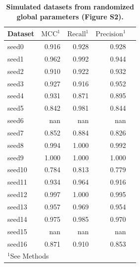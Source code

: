 \begin{table}
\caption{\label{tab:example} \textbf{Simulated datasets from randomized global parameters (Figure S2).}}
\begin{tabular}{lrrrr}
\toprule
Dataset &  $\textrm{MCC}^1$ &  $\textrm{Recall}^1$ &  $\textrm{Precision}^1$ \\
\midrule
seed0 & 0.916  & 0.928  & 0.928 \\
\midrule
seed1 & 0.962  & 0.992  & 0.944 \\
\midrule
seed2 & 0.910  & 0.922  & 0.932 \\
\midrule
seed3 & 0.927  & 0.916  & 0.952 \\
\midrule
seed4 & 0.931  & 0.871  & 0.895 \\
\midrule
seed5 & 0.842  & 0.981  & 0.844 \\
\midrule
seed6 & nan  & nan  & nan \\
\midrule
seed7 & 0.852  & 0.884  & 0.826 \\
\midrule
seed8 & 0.994  & 1.000  & 0.992 \\
\midrule
seed9 & 1.000  & 1.000  & 1.000 \\
\midrule
seed10 & 0.784  & 0.813  & 0.779 \\
\midrule
seed11 & 0.934  & 0.964  & 0.916 \\
\midrule
seed12 & 0.997  & 1.000  & 0.995 \\
\midrule
seed13 & 0.957  & 0.969  & 0.954 \\
\midrule
seed14 & 0.975  & 0.985  & 0.970 \\
\midrule
seed15 & nan  & nan  & nan \\
\midrule
seed16 & 0.871  & 0.910  & 0.853 \\
\bottomrule
\multicolumn{4}{l}{\footnotesize{\parbox{2.5in}{$^1$See Methods}}}
\end{tabular}
\end{table}

\clearpage

